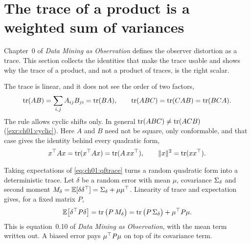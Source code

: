 

\section{The trace of a product is a weighted sum of variances}\label{sec:ch01:trace}

Chapter~0 of \emph{Data Mining as Observation} defines the observer distortion as
a trace. This section collects the identities that make the trace usable and
shows why the trace of a product, and not a product of traces, is the right
scalar.

The trace is linear, and it does not see the order of two factors,
\begin{equation}\label{eq:ch01:cyclic}
\operatorname{tr}(AB)=\sum_{i,j}A_{ij}B_{ji}=\operatorname{tr}(BA),\qquad \operatorname{tr}(ABC)=\operatorname{tr}(CAB)=\operatorname{tr}(BCA).
\end{equation}
The rule allows cyclic shifts only. In general $\operatorname{tr}(ABC)\neq\operatorname{tr}(ACB)$
(\cref{exr:ch01:cyclic}). Here $A$ and $B$ need not be square, only
conformable, and that case gives the identity behind every quadratic form,
\begin{equation}\label{eq:ch01:qftrace}
x^{\top} Ax=\operatorname{tr}(x^{\top} Ax)=\operatorname{tr}(A\,xx^{\top}),\qquad \lVert x\rVert^2=\operatorname{tr}(xx^{\top}).
\end{equation}

Taking expectations of \cref{eq:ch01:qftrace} turns a random quadratic form
into a deterministic trace. Let $\delta$ be a random error with mean $\mu$,
covariance $\Sigma_\delta$ and second moment $M_\delta=\mathbb{E}[\delta\delta^{\top}]=\Sigma_\delta+\mu\mu^{\top}$.
Linearity of trace and expectation gives, for a fixed matrix $P$,
\begin{equation}\label{eq:ch01:expqf}
\mathbb{E}\big[\delta^{\top} P\delta\big]=\operatorname{tr}\big(P\,M_\delta\big)=\operatorname{tr}\big(P\,\Sigma_\delta\big)+\mu^{\top} P\mu .
\end{equation}
This is equation~0.10 of \emph{Data Mining as Observation}, with the mean term written out.
A biased error pays $\mu^{\top} P\mu$ on top of its covariance term.

